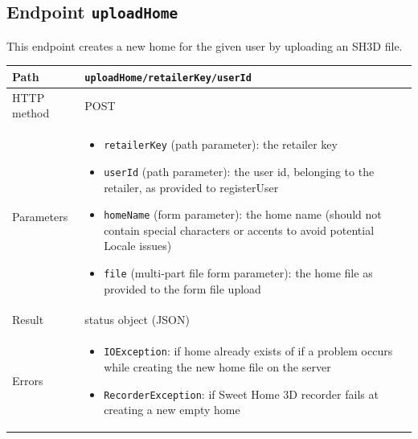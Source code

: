 \documentclass[a4paper]{report}
\begin{document}
\subsection{Endpoint \texttt{uploadHome}}

This endpoint creates a new home for the given user by uploading an SH3D file.

\begin{center}
\begin{tabularx} {\textwidth} { | l | X | }

\hline

Path & \texttt{uploadHome/retailerKey/userId} \\

\hline

HTTP method & POST \\

\hline

Parameters & \begin{itemize}[leftmargin=*,noitemsep,topsep=0px]
\item \texttt{retailerKey} (path parameter): the retailer key
\item \texttt{userId} (path parameter): the user id, belonging to the retailer, as provided to registerUser 
\item \texttt{homeName} (form parameter): the home name (should not contain special characters or accents to avoid potential Locale issues) 
\item \texttt{file} (multi-part file form parameter): the home file as provided to the form file upload
\end{itemize} \\

\hline

Result & status object (JSON) \\

\hline

Errors & \begin{itemize}[leftmargin=*,noitemsep,topsep=0px]
\item \texttt{IOException}: if home already exists of if a problem occurs while creating the new home file on the server
\item \texttt{RecorderException}: if Sweet Home 3D recorder fails at creating a new empty home
\end{itemize} \\

\hline

\end{tabularx}
\end{center}
\end{document}
